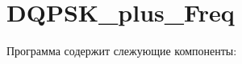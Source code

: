 \chapter{DQPSK\+\_\+plus\+\_\+\+Freq}
\hypertarget{index}{}\label{index}
Программа содержит слежующие компоненты\+: 